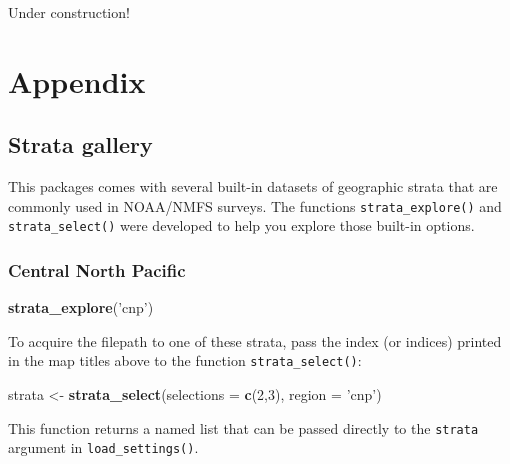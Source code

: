 \documentclass[
]{book}
\newenvironment{Shaded}{\begin{snugshade}}{\end{snugshade}}
\newcommand{\DataTypeTok}[1]{\textcolor[rgb]{0.13,0.29,0.53}{#1}}
\newcommand{\DecValTok}[1]{\textcolor[rgb]{0.00,0.00,0.81}{#1}}
\newcommand{\KeywordTok}[1]{\textcolor[rgb]{0.13,0.29,0.53}{\textbf{#1}}}
\newcommand{\NormalTok}[1]{#1}
\newcommand{\StringTok}[1]{\textcolor[rgb]{0.31,0.60,0.02}{#1}}
\begin{document}
Under construction!

\hypertarget{part-appendix}{%
\part{Appendix}\label{part-appendix}}

\hypertarget{stratagallery}{%
\chapter{Strata gallery}\label{stratagallery}}

This packages comes with several built-in datasets of geographic strata that are commonly used in NOAA/NMFS surveys. The functions \texttt{strata\_explore()} and \texttt{strata\_select()} were developed to help you explore those built-in options.

\hypertarget{central-north-pacific}{%
\section*{Central North Pacific}\label{central-north-pacific}}

\begin{Shaded}
\begin{Highlighting}[]
\KeywordTok{strata_explore}\NormalTok{(}\StringTok{'cnp'}\NormalTok{)}
\end{Highlighting}
\end{Shaded}

To acquire the filepath to one of these strata, pass the index (or indices) printed in the map titles above to the function \texttt{strata\_select()}:

\begin{Shaded}
\begin{Highlighting}[]
\NormalTok{strata <-}\StringTok{ }\KeywordTok{strata_select}\NormalTok{(}\DataTypeTok{selections =} \KeywordTok{c}\NormalTok{(}\DecValTok{2}\NormalTok{,}\DecValTok{3}\NormalTok{),}
                              \DataTypeTok{region =} \StringTok{'cnp'}\NormalTok{)}
\end{Highlighting}
\end{Shaded}

This function returns a named list that can be passed directly to the \texttt{strata} argument in \texttt{load\_settings()}.
\end{document}
